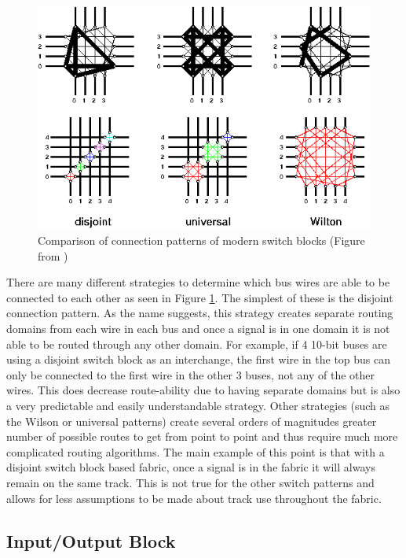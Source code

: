\documentclass[12pt]{article}
\begin{document}
\begin{figure}[ht]
  \centering
  \includegraphics[width=.6\textwidth]{switch_blocks}
  \caption{Comparison of connection patterns of modern switch blocks (Figure from \cite{switch_blocks})}
  \label{fig:switch_blocks}
\end{figure}

There are many different strategies to determine which bus wires are able to be connected 
to each other as seen in Figure \ref{fig:switch_blocks}. The simplest of these is the disjoint
connection pattern. As the name 
suggests, this strategy creates separate routing domains from each wire in each bus 
and once a signal is in one domain it is not able to be routed through any other 
domain. For example, if 4 10-bit buses are using a disjoint switch block as an interchange,
the first wire in the top bus can only be connected to the first wire in the other 
3 buses, not any of the other wires. This does decrease route-ability due to having 
separate domains but is also a very predictable and easily understandable strategy.
Other strategies (such as the Wilson or universal patterns) create several orders 
of magnitudes greater number of possible routes to get from point to point and thus 
require much more complicated routing algorithms. The main example of this point is that
with a disjoint switch block based fabric, once a signal is in the fabric it will always
remain on the same track. This is not true for the other switch patterns and allows for
less assumptions to be made about track use throughout the fabric. 

\subsection{Input/Output Block}
\end{document}
